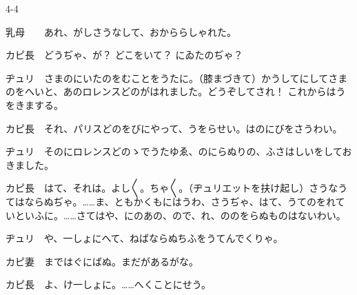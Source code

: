 \documentclass[tate,paper=b6j,jafontsize=9pt]{jlreq}
\begin{document}
\begin{azconvIndented}{4\zw}{-4\zw}

乳母　　あれ、がしさうなして、おかららしゃれた。

カピ長　どうぢゃ、が？ どこをいて？ にゐたのぢゃ？

ヂュリ　さまのにいたのをむことをうたに。（膝まづきて）かうしてにしてさまのをへいと、あのロレンスどのがはれました。どうぞしてされ！ これからはうをきまする。

カピ長　それ、パリスどのをびにやって、うをらせい。はのにびをさうわい。

ヂュリ　そのにロレンスどのゝでうたゆゑ、のにらぬりの、ふさはしいをしておきました。

カピ長　はて、それは。よし{〳〵}。ちゃ{〳〵}。（ヂュリエットを扶け起し）さうなうてはならぬぢゃ。……ま、ともかくもにはうわ、さうぢゃ、はて、うてのをれていといふに。……さてはや、にのあの、ので、れ、ののをらぬものはないわい。

ヂュリ　や、一しょにへて、ねばならぬちふをうてんでくりゃ。

カピ妻　まではぐにばぬ。まだがあるがな。

カピ長　よ、け一しょに。……へくことにせう。

\end{azconvIndented}
\end{document}

